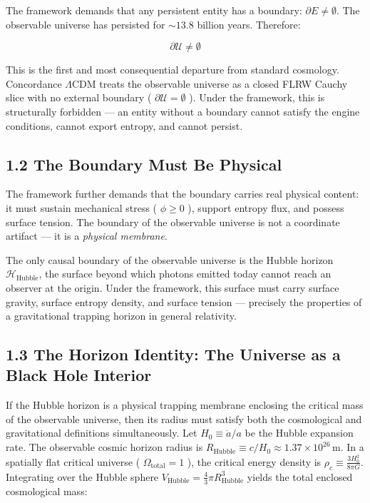 \documentclass[11pt,a4paper]{article}
\theoremstyle{definition}\newtheorem{definition}{Definition}
\theoremstyle{remark}\newtheorem{remark}{Remark}
\begin{document}
The framework demands that any persistent entity has a boundary: $\partial E \neq \emptyset$. The observable universe has persisted for $\sim 13.8$ billion years. Therefore:


\begin{equation}
\partial\mathcal{U} \neq \emptyset
\end{equation}


This is the first and most consequential departure from standard cosmology. Concordance $\Lambda\text{CDM}$ treats the observable universe as a closed FLRW Cauchy slice with no external boundary ( $\partial\mathcal{U} = \emptyset$ ). Under the framework, this is structurally forbidden — an entity without a boundary cannot satisfy the engine conditions, cannot export entropy, and cannot persist.
\subsection{1.2 The Boundary Must Be Physical}

The framework further demands that the boundary carries real physical content: it must sustain mechanical stress ( $\phi \ge 0$ ), support entropy flux, and possess surface tension. The boundary of the observable universe is not a coordinate artifact — it is a \textit{physical membrane}.

The only causal boundary of the observable universe is the Hubble horizon $\mathcal{H}_{\text{Hubble}}$, the surface beyond which photons emitted today cannot reach an observer at the origin. Under the framework, this surface must carry surface gravity, surface entropy density, and surface tension — precisely the properties of a gravitational trapping horizon in general relativity.
\subsection{1.3 The Horizon Identity: The Universe as a Black Hole Interior}

If the Hubble horizon is a physical trapping membrane enclosing the critical mass of the observable universe, then its radius must satisfy both the cosmological and gravitational definitions simultaneously. Let $H_0 \equiv \dot{a}/a$ be the Hubble expansion rate. The observable cosmic horizon radius is $R_{\text{Hubble}} \equiv c/H_0 \approx 1.37 \times 10^{26} \, \mathrm{m}$. In a spatially flat critical universe ( $\Omega_{\text{total}} = 1$ ), the critical energy density is $\rho_c \equiv \frac{3 H_0^2}{8\pi G}$. Integrating over the Hubble sphere $V_{\text{Hubble}} = \frac{4}{3}\pi R_{\text{Hubble}}^3$ yields the total enclosed cosmological mass:
\end{document}
